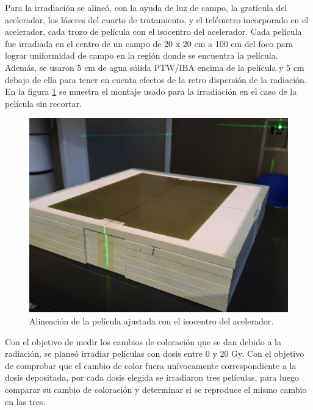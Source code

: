Para la irradiación se alineó, con la ayuda de luz de campo, la gratícula del acelerador, los láseres del cuarto de tratamiento, y el telémetro incorporado en el acelerador, cada trozo de película con el isocentro del acelerador. Cada película fue irradiada en el centro de un campo de 20 x 20 cm a 100 cm del foco para lograr uniformidad de campo en la región donde se encuentra la película. Además, se usaron 5 cm de agua sólida PTW/IBA encima de la película y 5 cm debajo de ella para tener en cuenta efectos de la retro dispersión de la radiación. En la figura  \ref{fig:MontajePelicula} se muestra el montaje usado para la irradiación en el caso de la película sin recortar.\\
\begin{figure}
	\centering
	\includegraphics[width=0.7\linewidth]{images/alineacionCampo.jpg}
	\caption{Alineación de la película ajustada con el isocentro del acelerador.}
	\label{fig:MontajePelicula}
\end{figure}

Con el objetivo de medir los cambios de coloración que se dan debido a la radiación, se planeó irradiar películas con dosis entre 0 y 20 Gy. Con el objetivo de comprobar que el cambio de color fuera unívocamente correspondiente a la dosis depositada, por cada dosis elegida se irradiaron tres películas, para luego comparar su cambio de coloración y determinar si se reproduce el mismo cambio en las tres.\\ 


